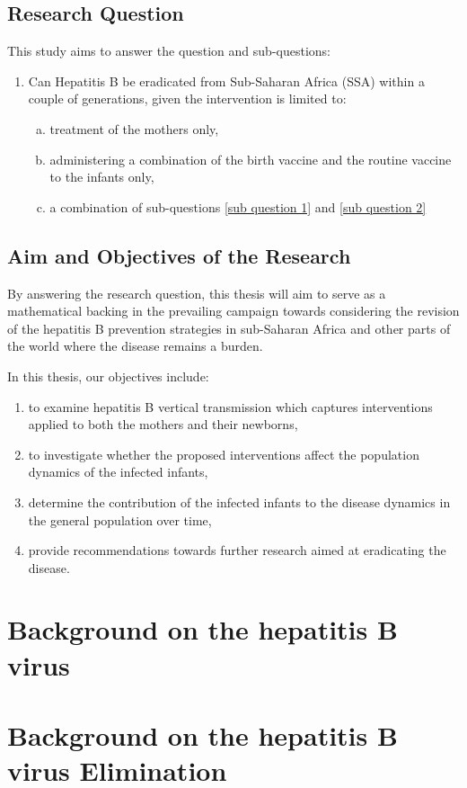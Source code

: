 \subsection{Research Question}
\label{section: research questions}
This study aims to answer the question and sub-questions: 
\begin{enumerate}[1.]
	\item Can Hepatitis B be eradicated from Sub-Saharan Africa (SSA) within a couple of generations, given the intervention is limited to: 
	\begin{enumerate} [(a)]
		\item treatment of the mothers only,  \label{sub question 1}
		\item administering a combination of the birth vaccine and the routine vaccine to the infants only, \label{sub question 2}
		\item a combination of sub-questions \ref{sub question 1} and \ref{sub question 2}
	\end{enumerate}
\end{enumerate}

\subsection{Aim and Objectives of the Research}
By answering the research question, this thesis will aim to serve as a mathematical backing in the prevailing campaign towards considering the revision of the hepatitis B prevention strategies in sub-Saharan Africa and other parts of the world where the disease remains a burden.  

In this thesis, our objectives include:
\begin{enumerate}
	\item to examine hepatitis B vertical transmission which captures interventions applied to both the mothers and their newborns,
	\item to investigate whether the proposed interventions affect the population dynamics of the infected infants,
	\item determine the contribution of the infected infants to the disease dynamics in the general population over time,
	\item provide recommendations towards further research aimed at eradicating the disease.
	
\end{enumerate}

\section{Background on the hepatitis B virus} 
\section{Background on the hepatitis B virus Elimination} 
